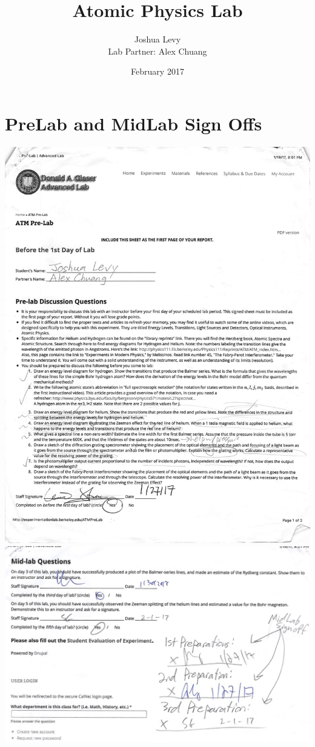 \documentclass{article}
\title{Atomic Physics Lab}
\author{Joshua Levy\\Lab Partner: Alex Chuang}
\date{February 2017\newpage}
\begin{document}
\maketitle

\section{PreLab and MidLab Sign Offs}
\begin{center}
\includegraphics[scale = 0.28]{JoshATM1.jpg}
\includegraphics[scale = 0.28]{JoshATM2.jpg}
\end{center}
\end{document}
